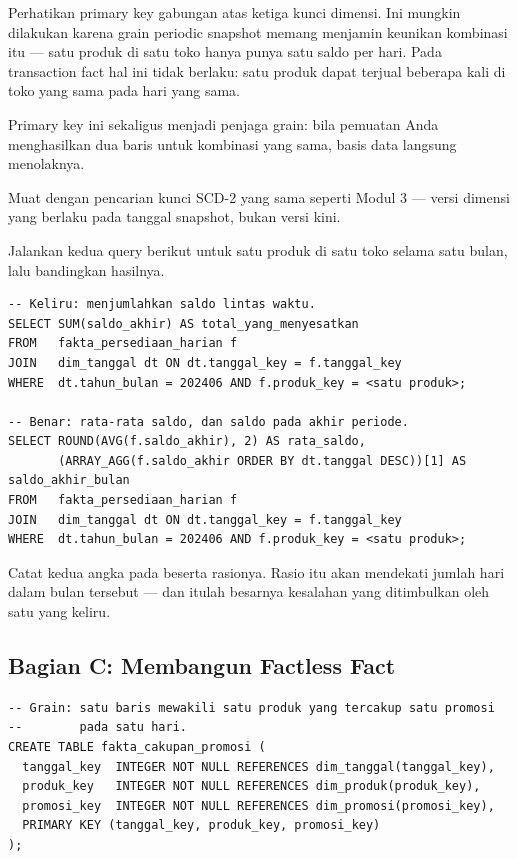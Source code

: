 \begin{catatan}
Perhatikan primary key gabungan atas ketiga kunci dimensi. Ini mungkin
dilakukan karena grain periodic snapshot memang menjamin keunikan kombinasi
itu --- satu produk di satu toko hanya punya satu saldo per hari. Pada
transaction fact hal ini tidak berlaku: satu produk dapat terjual beberapa kali
di toko yang sama pada hari yang sama.

Primary key ini sekaligus menjadi penjaga grain: bila pemuatan Anda
menghasilkan dua baris untuk kombinasi yang sama, basis data langsung
menolaknya.
\end{catatan}

Muat dengan pencarian kunci SCD-2 yang sama seperti Modul 3 --- versi dimensi
yang berlaku pada tanggal snapshot, bukan versi kini.


Jalankan kedua query berikut untuk satu produk di satu toko selama satu bulan,
lalu bandingkan hasilnya.

\begin{lstlisting}[style=sqlgaya]
-- Keliru: menjumlahkan saldo lintas waktu.
SELECT SUM(saldo_akhir) AS total_yang_menyesatkan
FROM   fakta_persediaan_harian f
JOIN   dim_tanggal dt ON dt.tanggal_key = f.tanggal_key
WHERE  dt.tahun_bulan = 202406 AND f.produk_key = <satu produk>;

-- Benar: rata-rata saldo, dan saldo pada akhir periode.
SELECT ROUND(AVG(f.saldo_akhir), 2) AS rata_saldo,
       (ARRAY_AGG(f.saldo_akhir ORDER BY dt.tanggal DESC))[1] AS saldo_akhir_bulan
FROM   fakta_persediaan_harian f
JOIN   dim_tanggal dt ON dt.tanggal_key = f.tanggal_key
WHERE  dt.tahun_bulan = 202406 AND f.produk_key = <satu produk>;
\end{lstlisting}

Catat kedua angka pada  beserta rasionya. Rasio
itu akan mendekati jumlah hari dalam bulan tersebut --- dan itulah besarnya
kesalahan yang ditimbulkan oleh satu  yang keliru.

\subsection{Bagian C: Membangun Factless Fact}


\begin{lstlisting}[style=sqlgaya]
-- Grain: satu baris mewakili satu produk yang tercakup satu promosi
--        pada satu hari.
CREATE TABLE fakta_cakupan_promosi (
  tanggal_key  INTEGER NOT NULL REFERENCES dim_tanggal(tanggal_key),
  produk_key   INTEGER NOT NULL REFERENCES dim_produk(produk_key),
  promosi_key  INTEGER NOT NULL REFERENCES dim_promosi(promosi_key),
  PRIMARY KEY (tanggal_key, produk_key, promosi_key)
);
\end{lstlisting}

